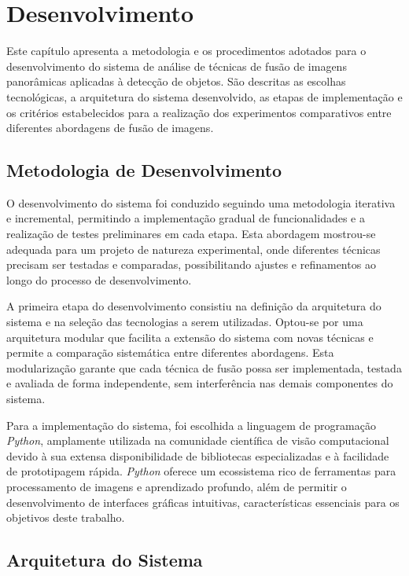 \chapter{Desenvolvimento}




Este capítulo apresenta a metodologia e os procedimentos adotados para o desenvolvimento do sistema de análise de técnicas de fusão de imagens panorâmicas aplicadas à detecção de objetos. São descritas as escolhas tecnológicas, a arquitetura do sistema desenvolvido, as etapas de implementação e os critérios estabelecidos para a realização dos experimentos comparativos entre diferentes abordagens de fusão de imagens.

\section{Metodologia de Desenvolvimento}

O desenvolvimento do sistema foi conduzido seguindo uma metodologia iterativa e incremental, permitindo a implementação gradual de funcionalidades e a realização de testes preliminares em cada etapa. Esta abordagem mostrou-se adequada para um projeto de natureza experimental, onde diferentes técnicas precisam ser testadas e comparadas, possibilitando ajustes e refinamentos ao longo do processo de desenvolvimento.

A primeira etapa do desenvolvimento consistiu na definição da arquitetura do sistema e na seleção das tecnologias a serem utilizadas. Optou-se por uma arquitetura modular que facilita a extensão do sistema com novas técnicas e permite a comparação sistemática entre diferentes abordagens. Esta modularização garante que cada técnica de fusão possa ser implementada, testada e avaliada de forma independente, sem interferência nas demais componentes do sistema.

Para a implementação do sistema, foi escolhida a linguagem de programação \textit{Python}, amplamente utilizada na comunidade científica de visão computacional devido à sua extensa disponibilidade de bibliotecas especializadas e à facilidade de prototipagem rápida. \textit{Python} oferece um ecossistema rico de ferramentas para processamento de imagens e aprendizado profundo, além de permitir o desenvolvimento de interfaces gráficas intuitivas, características essenciais para os objetivos deste trabalho.

\section{Arquitetura do Sistema}

